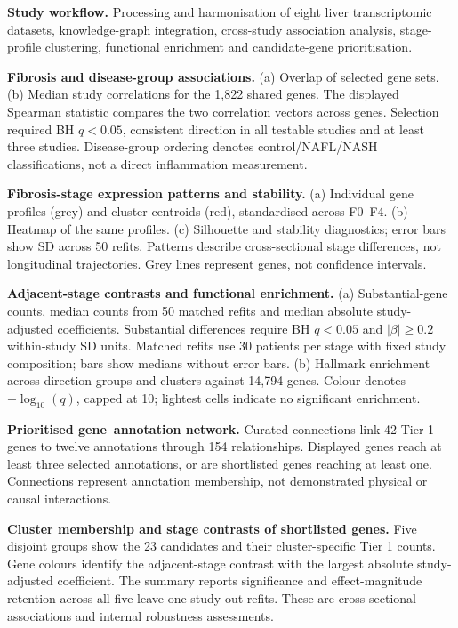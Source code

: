 
\caption{\textbf{Study workflow.} Processing and harmonisation of eight liver transcriptomic datasets, knowledge-graph integration, cross-study association analysis, stage-profile clustering, functional enrichment and candidate-gene prioritisation.}

\caption{\textbf{Fibrosis and disease-group associations.} (a) Overlap of selected gene sets. (b) Median study correlations for the 1,822 shared genes. The displayed Spearman statistic compares the two correlation vectors across genes. Selection required BH \(q<0.05\), consistent direction in all testable studies and at least three studies. Disease-group ordering denotes control/NAFL/NASH classifications, not a direct inflammation measurement.}

\caption{\textbf{Fibrosis-stage expression patterns and stability.} (a) Individual gene profiles (grey) and cluster centroids (red), standardised across F0--F4. (b) Heatmap of the same profiles. (c) Silhouette and stability diagnostics; error bars show SD across 50 refits. Patterns describe cross-sectional stage differences, not longitudinal trajectories. Grey lines represent genes, not confidence intervals.}

\caption{\textbf{Adjacent-stage contrasts and functional enrichment.} (a) Substantial-gene counts, median counts from 50 matched refits and median absolute study-adjusted coefficients. Substantial differences require BH \(q<0.05\) and \(|\beta|\geq0.2\) within-study SD units. Matched refits use 30 patients per stage with fixed study composition; bars show medians without error bars. (b) Hallmark enrichment across direction groups and clusters against 14,794 genes. Colour denotes \(-\log_{10}(q)\), capped at 10; lightest cells indicate no significant enrichment.}

\caption{\textbf{Prioritised gene--annotation network.} Curated connections link 42 Tier 1 genes to twelve annotations through 154 relationships. Displayed genes reach at least three selected annotations, or are shortlisted genes reaching at least one. Connections represent annotation membership, not demonstrated physical or causal interactions.}

\caption{\textbf{Cluster membership and stage contrasts of shortlisted genes.} Five disjoint groups show the 23 candidates and their cluster-specific Tier 1 counts. Gene colours identify the adjacent-stage contrast with the largest absolute study-adjusted coefficient. The summary reports significance and effect-magnitude retention across all five leave-one-study-out refits. These are cross-sectional associations and internal robustness assessments.}
